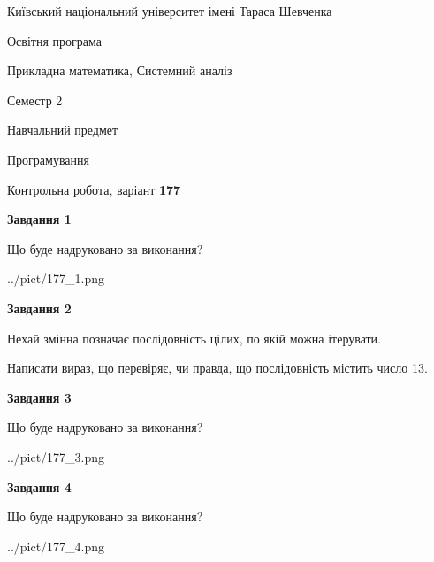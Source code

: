\documentclass[12pt, ukrainian]{article}
\begin{document}
{{\begin {small}\par
{ \center  Київський національний університет імені Тараса Шевченка \par}
{\parbox {5 cm}{Освітня програма \hfill}{\parbox {8 cm}{Прикладна математика, Системний аналіз \hfill}}\parbox {5 cm}{\hfill Семестр 2}}\par
{\parbox {5 cm} {Навчальний предмет \hfill}\parbox {7 cm}{Програмування \hfill}\parbox {6cm}{\hfill}\par}\vspace{-7pt} \end{small}}{\center Контрольна робота, варіант  \No \textbf
{ 177 }\par}}
{
\begin {large}
{\begin {center}\textbf{Завдання 1}\end {center}}\par
Що буде надруковано за виконання?\par\par
\begin{center}
	{../pict/177_1.png}
\end{center}
\newpage

{\begin {center}\textbf{Завдання 2}\end {center}}\par
Нехай змінна  позначає послідовність цілих, по якій можна ітерувати.

Написати вираз, що перевіряє, чи правда, що послідовність  містить число 13.\par
\newpage

{\begin {center}\textbf{Завдання 3}\end {center}}\par
Що буде надруковано за виконання?
\begin{center}
	{../pict/177_3.png}
\end{center}
\newpage

{\begin {center}\textbf{Завдання 4}\end {center}}\par
Що буде надруковано за виконання?\par
\begin{center}
	{../pict/177_4.png}
\end{center}
\newpage


\end{large}}
\end{document}
